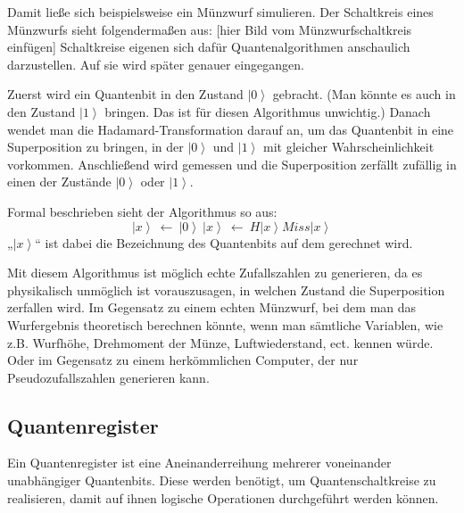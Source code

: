 Damit ließe sich beispielsweise ein Münzwurf simulieren. Der Schaltkreis eines Münzwurfs sieht folgendermaßen aus: [hier Bild vom Münzwurfschaltkreis einfügen] Schaltkreise eigenen sich dafür Quantenalgorithmen anschaulich darzustellen. Auf sie wird später genauer eingegangen.

Zuerst wird ein Quantenbit in den Zustand $\left|0\right\rangle$ gebracht. (Man könnte es auch in den Zustand $\left|1\right\rangle$ bringen. Das ist für diesen Algorithmus unwichtig.) Danach wendet man die Hadamard-Transformation darauf an, um das Quantenbit in eine Superposition zu bringen, in der $\left|0\right\rangle$ und $\left|1\right\rangle$ mit gleicher Wahrscheinlichkeit vorkommen. Anschließend wird gemessen und die Superposition zerfällt zufällig in einen der Zustände $\left|0\right\rangle$ oder $\left|1\right\rangle$.

Formal beschrieben sieht der Algorithmus so aus:
	$$\left|\left.x\right\rangle\right.\ \gets\ \left|\left.0\right\rangle\right.\ 
	\left|\left.x\right\rangle\right.\ \gets\ H\left|\left.x\right\rangle\right.
	Miss\left|\left.x\right\rangle\right.$$
„$\left|x\right\rangle$“ ist dabei die Bezeichnung des Quantenbits auf dem gerechnet wird.

Mit diesem Algorithmus ist möglich echte Zufallszahlen zu generieren, da es physikalisch unmöglich ist vorauszusagen, in welchen Zustand die Superposition zerfallen wird. Im Gegensatz zu einem echten Münzwurf, bei dem man das Wurfergebnis theoretisch berechnen könnte, wenn man sämtliche Variablen, wie z.B. Wurfhöhe, Drehmoment der Münze, Luftwiederstand, ect. kennen würde. Oder im Gegensatz zu einem herkömmlichen Computer, der nur Pseudozufallszahlen generieren kann. 
\subsection{Quantenregister}

Ein Quantenregister ist eine Aneinanderreihung mehrerer voneinander unabhängiger Quantenbits. Diese werden benötigt, um Quantenschaltkreise zu realisieren, damit auf ihnen logische Operationen durchgeführt werden können. 

